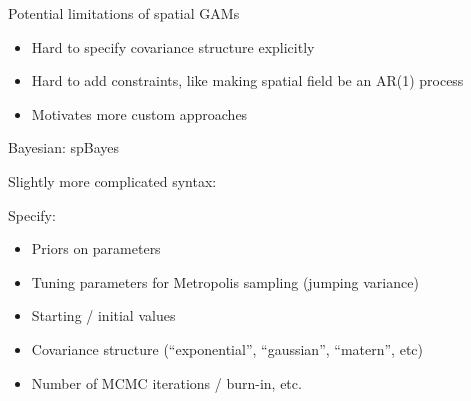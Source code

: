 \documentclass[ignorenonframetext,]{beamer}
\providecommand{\tightlist}{%
  \setlength{\itemsep}{0pt}\setlength{\parskip}{0pt}}
\begin{document}
\begin{frame}{Potential limitations of spatial GAMs}
\protect\hypertarget{potential-limitations-of-spatial-gams}{}

\begin{itemize}
\item
  Hard to specify covariance structure explicitly
\item
  Hard to add constraints, like making spatial field be an AR(1) process
\item
  Motivates more custom approaches
\end{itemize}

\end{frame}

\begin{frame}{Bayesian: spBayes}
\protect\hypertarget{bayesian-spbayes}{}

Slightly more complicated syntax:

Specify:

\begin{itemize}
\tightlist
\item
  Priors on parameters
\item
  Tuning parameters for Metropolis sampling (jumping variance)
\item
  Starting / initial values
\item
  Covariance structure (``exponential'', ``gaussian'', ``matern'', etc)
\item
  Number of MCMC iterations / burn-in, etc.
\end{itemize}

\end{frame}
\end{document}
